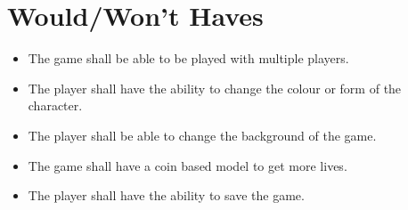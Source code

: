 \section{Would/Won't Haves}
\begin{itemize}
\itemsep0em 
	\item The game shall be able to be played with multiple players.
	\item The player shall have the ability to change the colour or form of the character.
	\item The player shall be able to change the background of the game.
	\item The game shall have a coin based model to get more lives.
	\item The player shall have the ability to save the game.
\end{itemize}
